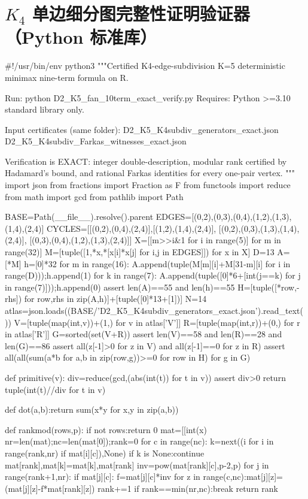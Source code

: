 \documentclass[UTF8,11pt,a4paper]{ctexart}
\begin{document}
\section{$K_4$ 单边细分图完整性证明验证器（Python 标准库）}
\begin{CodeListing}
#!/usr/bin/env python3
"""Certified K4-edge-subdivision K=5 deterministic minimax nine-term formula on R.

Run: python D2_K5_fan_10term_exact_verify.py
Requires: Python >=3.10 standard library only.

Input certificates (same folder):
  D2_K5_K4subdiv_generators_exact.json
  D2_K5_K4subdiv_Farkas_witnesses_exact.json

Verification is EXACT: integer double-description, modular rank certified by
Hadamard's bound, and rational Farkas identities for every one-pair vertex.
"""
import json
from fractions import Fraction as F
from functools import reduce
from math import gcd
from pathlib import Path

BASE=Path(__file__).resolve().parent
EDGES=[(0,2),(0,3),(0,4),(1,2),(1,3),(1,4),(2,4)]
CYCLES=[[(0,2),(0,4),(2,4)],[(1,2),(1,4),(2,4)],
        [(0,2),(0,3),(1,3),(1,4),(2,4)],
        [(0,3),(0,4),(1,2),(1,3),(2,4)]]
X=[[m>>i&1 for i in range(5)] for m in range(32)]
M=[tuple([1,*x,*[x[i]*x[j] for i,j in EDGES]]) for x in X]
D=13
A=[*M]
h=[0]*32
for m in range(16):
    A.append(tuple(M[m][i]+M[31-m][i] for i in range(D)));h.append(1)
for k in range(7):
    A.append(tuple([0]*6+[int(j==k) for j in range(7)]));h.append(0)
assert len(A)==55 and len(h)==55
H=[tuple([*row,-rhs]) for row,rhs in zip(A,h)]+[tuple([0]*13+[1])]
N=14
atlas=json.loads((BASE/'D2_K5_K4subdiv_generators_exact.json').read_text())
V=[tuple(map(int,v))+(1,) for v in atlas['V']]
R=[tuple(map(int,r))+(0,) for r in atlas['R']]
G=sorted(set(V+R))
assert len(V)==58 and len(R)==28 and len(G)==86
assert all(z[-1]>0 for z in V) and all(z[-1]==0 for z in R)
assert all(all(sum(a*b for a,b in zip(row,g))>=0 for row in H) for g in G)


def primitive(v):
    div=reduce(gcd,(abs(int(t)) for t in v))
    assert div>0
    return tuple(int(t)//div for t in v)


def dot(a,b):return sum(x*y for x,y in zip(a,b))


def rankmod(rows,p):
    if not rows:return 0
    mat=[[int(x)%
    nr=len(mat);nc=len(mat[0]);rank=0
    for c in range(nc):
        k=next((i for i in range(rank,nr) if mat[i][c]),None)
        if k is None:continue
        mat[rank],mat[k]=mat[k],mat[rank]
        inv=pow(mat[rank][c],p-2,p)
        for j in range(rank+1,nr):
            if mat[j][c]:
                f=mat[j][c]*inv%
                for z in range(c,nc):mat[j][z]=(mat[j][z]-f*mat[rank][z])%
        rank+=1
        if rank==min(nr,nc):break
    return rank


\end{CodeListing}
\end{document}
